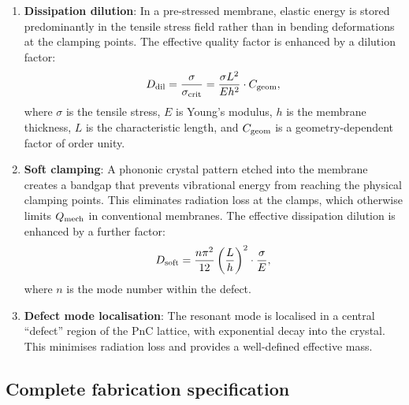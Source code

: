 \documentclass[11pt]{article}
\theoremstyle{definition}
\theoremstyle{remark}
\newcommand{\Qmech}{Q_{\rm mech}}
\begin{document}
\begin{enumerate}
  \item \textbf{Dissipation dilution}: In a pre-stressed membrane,
    elastic energy is stored predominantly in the tensile stress field
    rather than in bending deformations at the clamping points. The
    effective quality factor is enhanced by a dilution factor:
    \begin{equation}
      D_{\rm dil} = \frac{\sigma}{\sigma_{\rm crit}}
      = \frac{\sigma L^2}{E h^2}\cdot C_{\rm geom},
      \label{eq:dilution}
    \end{equation}
    where $\sigma$ is the tensile stress, $E$ is Young's modulus, $h$
    is the membrane thickness, $L$ is the characteristic length, and
    $C_{\rm geom}$ is a geometry-dependent factor of order unity.

  \item \textbf{Soft clamping}: A phononic crystal pattern etched into
    the membrane creates a bandgap that prevents vibrational energy from
    reaching the physical clamping points. This eliminates radiation loss
    at the clamps, which otherwise limits $\Qmech$ in conventional
    membranes. The effective dissipation dilution is enhanced by a
    further factor:
    \begin{equation}
      D_{\rm soft} = \frac{n\pi^2}{12}\left(\frac{L}{h}\right)^2
      \cdot \frac{\sigma}{E},
      \label{eq:soft_clamp}
    \end{equation}
    where $n$ is the mode number within the defect.

  \item \textbf{Defect mode localisation}: The resonant mode is
    localised in a central ``defect'' region of the PnC lattice,
    with exponential decay into the crystal. This minimises radiation
    loss and provides a well-defined effective mass.
\end{enumerate}

\subsection{Complete fabrication specification}
\end{document}
